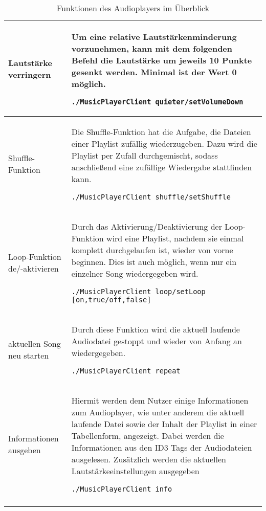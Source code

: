 \begin{longtable}{l|l}
Lautstärke verringern & \begin{minipage}[t]{.558\textwidth} 
Um eine relative Lautstärkenminderung vorzunehmen, kann mit dem folgenden Befehl die Lautstärke um jeweils 10 Punkte gesenkt werden. Minimal ist der Wert 0 möglich. \begin{lstlisting}
./MusicPlayerClient quieter/setVolumeDown
\end{lstlisting} \end{minipage} \\ \hline

Shuffle-Funktion & \begin{minipage}[t]{.558\textwidth} Die Shuffle-Funktion hat die Aufgabe, die Dateien einer Playlist zufällig wiederzugeben. Dazu wird die Playlist per Zufall durchgemischt, sodass anschließend eine zufällige Wiedergabe stattfinden kann. \begin{lstlisting}
./MusicPlayerClient shuffle/setShuffle
\end{lstlisting} \end{minipage} \\ \hline

Loop-Funktion de/-aktivieren & \begin{minipage}[t]{.558\textwidth} Durch das Aktivierung/Deaktivierung der Loop-Funktion wird eine Playlist, nachdem sie einmal komplett durchgelaufen ist, wieder von vorne beginnen. Dies ist auch möglich, wenn nur ein einzelner Song wiedergegeben wird. \begin{lstlisting}
./MusicPlayerClient loop/setLoop [on,true/off,false]
\end{lstlisting} \end{minipage} \\ \hline

aktuellen Song neu starten & \begin{minipage}[t]{.558\textwidth} Durch diese Funktion wird die aktuell laufende Audiodatei gestoppt und wieder von Anfang an wiedergegeben. \begin{lstlisting}
./MusicPlayerClient repeat
\end{lstlisting} \end{minipage} \\ \hline

Informationen ausgeben & \begin{minipage}[t]{.558\textwidth} Hiermit werden dem Nutzer einige Informationen zum Audioplayer, wie unter anderem die aktuell laufende Datei sowie der Inhalt der Playlist in einer Tabellenform, angezeigt. Dabei werden die Informationen aus den ID3 Tags der Audiodateien ausgelesen. Zusätzlich werden die aktuellen Lautstärkeeinstellungen ausgegeben \begin{lstlisting}
./MusicPlayerClient info
\end{lstlisting} \end{minipage} \\
\caption{Funktionen des Audioplayers im Überblick} %
\label{tab:funktionendesaudioplayer_longtable}
\end{longtable}

